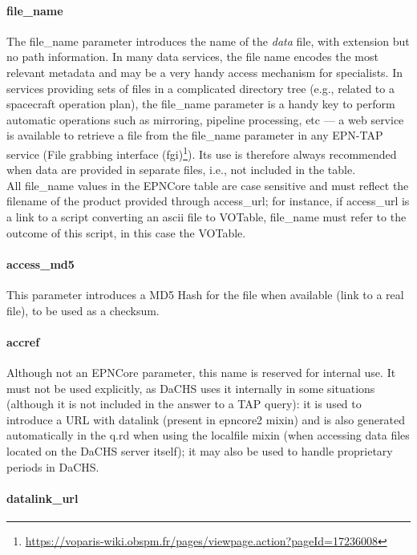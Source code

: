 \documentclass[11pt,a4paper]{ivoa}
\begin{document}
\paragraph{file\_name}

The file\_name parameter introduces the name of the \emph{data}
file, with extension but no path information. In many data services,
the file name encodes the most relevant metadata and may be a
very handy access mechanism for specialists. In services providing
sets of files in a complicated directory tree (e.g., related to
a spacecraft operation plan), the file\_name parameter is a handy
key to perform automatic operations such as mirroring, pipeline
processing, etc --- a web service is available to retrieve a file from
the file\_name parameter in any EPN-TAP service (File grabbing interface
(fgi)\footnote{\url{https://voparis-wiki.obspm.fr/pages/viewpage.action?pageId=17236008}}).
Its use is therefore always recommended when data are provided in separate
files, i.e., not included in the table.\\All file\_name values in the
EPNCore table are case sensitive and must reflect the filename of the
product provided through access\_url; for instance, if access\_url is
a link to a script converting an ascii file to VOTable, file\_name must
refer to the outcome of this script, in this case the VOTable.

\paragraph{access\_md5}

This parameter introduces a MD5 Hash for the file when available
(link to a real file), to be used as a checksum.

\paragraph{accref}

Although not an EPNCore parameter, this name is reserved for internal use.
It must not be used explicitly, as DaCHS uses it internally in some
situations (although it is not included in the answer to a TAP query):
it is used to introduce a URL with datalink (present in epncore2 mixin)
and is also generated automatically in the q.rd when using the localfile
mixin (when accessing data files located on the DaCHS server itself);
it may also be used to handle proprietary periods in DaCHS. \\

\paragraph{datalink\_url}
\end{document}
